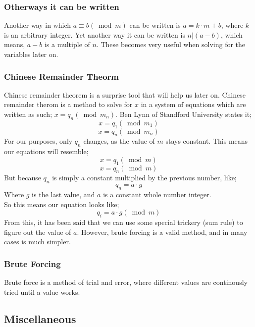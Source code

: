 \documentclass[12pft, english]{article}
\begin{document}
\begin{multicols}{2}
  \subsubsection{Otherways it can be written }
  Another way in which \( a \equiv b (\bmod m)\) can be written is \(a = k \cdot m + b\), where \(k\) is an arbitrary integer. Yet another way it can be written is \(n | (a-b) \), which means, \(a-b\) is a multiple of \(n\). These becomes very useful when solving for the variables later on.

  \subsubsection{Chinese Remainder Theorm}
  Chinese remainder theorem is a surprise tool that will help us later on. Chinese remainder therom is a method to solve for \(x\) in a system of equations which are written as such; \(x = q_{n} (\bmod m_{n})\). Ben Lynn of Standford University states it;
  \[x = q_{1} (\bmod m_{1})\]
  \[x = q_{n} (\bmod m_{n})\]
  \citep{standChinese}
  For our purposes, only \(q_{n}\) changes, as the value of \(m\) stays constant. This means our equations will resemble;
  \[x = q_{1} (\bmod m)\]
  \[x = q_{n} (\bmod m)\]
  But because \(q_{n}\) is simply a constant multiplied by the previous number, like;
  \[q_{n} = a \cdot g \]
  Where \(g\) is the last value, and \(a\) is a constant whole number integer. \\
  So this means our equation looks like;
  \[ q_{i} = a \cdot g (\bmod m)\]
  From this, it has been said that we can use some special trickery (sum rule) to figure out the value of \(a\). However, brute forcing is a valid method, and in many cases is much simpler.
  \subsubsection{Brute Forcing}
  Brute force is a method of trial and error, where different values are continously tried until a value works.

  \subsection{Miscellaneous}

\end{multicols}
\end{document}
